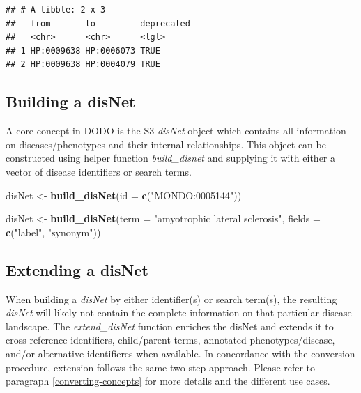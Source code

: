 \documentclass[9pt,a4paper,]{extarticle}
\newenvironment{Shaded}{\begin{snugshade}}{\end{snugshade}}
\newcommand{\DataTypeTok}[1]{\textcolor[rgb]{0.13,0.29,0.53}{#1}}
\newcommand{\KeywordTok}[1]{\textcolor[rgb]{0.13,0.29,0.53}{\textbf{#1}}}
\newcommand{\NormalTok}[1]{#1}
\newcommand{\StringTok}[1]{\textcolor[rgb]{0.31,0.60,0.02}{#1}}
\begin{document}
\begin{verbatim}
## # A tibble: 2 x 3
##   from       to         deprecated
##   <chr>      <chr>      <lgl>     
## 1 HP:0009638 HP:0006073 TRUE      
## 2 HP:0009638 HP:0004079 TRUE
\end{verbatim}

\hypertarget{building-a-disnet}{%
\subsection{Building a disNet}\label{building-a-disnet}}

A core concept in DODO is the S3 \emph{disNet} object which contains all information on diseases/phenotypes and their internal relationships. This object can be constructed using helper function \emph{build\_disnet} and supplying it with either a vector of disease identifiers or search terms.

\begin{Shaded}
\begin{Highlighting}[]
\NormalTok{disNet <-}\StringTok{ }\KeywordTok{build_disNet}\NormalTok{(}\DataTypeTok{id =} \KeywordTok{c}\NormalTok{(}\StringTok{"MONDO:0005144"}\NormalTok{))}

\NormalTok{disNet <-}\StringTok{ }\KeywordTok{build_disNet}\NormalTok{(}\DataTypeTok{term =} \StringTok{"amyotrophic lateral sclerosis"}\NormalTok{, }
                       \DataTypeTok{fields =} \KeywordTok{c}\NormalTok{(}\StringTok{"label"}\NormalTok{, }\StringTok{"synonym"}\NormalTok{))}
\end{Highlighting}
\end{Shaded}

\hypertarget{extending-a-disnet}{%
\subsection{Extending a disNet}\label{extending-a-disnet}}

When building a \emph{disNet} by either identifier(s) or search term(s), the resulting \emph{disNet} will likely not contain the complete information on that particular disease landscape. The \emph{extend\_disNet} function enriches the disNet and extends it to cross-reference identifiers, child/parent terms, annotated phenotypes/disease, and/or alternative identifieres when available. In concordance with the conversion procedure, extension follows the same two-step approach. Please refer to paragraph \ref{converting-concepts} for more details and the different use cases.
\end{document}

